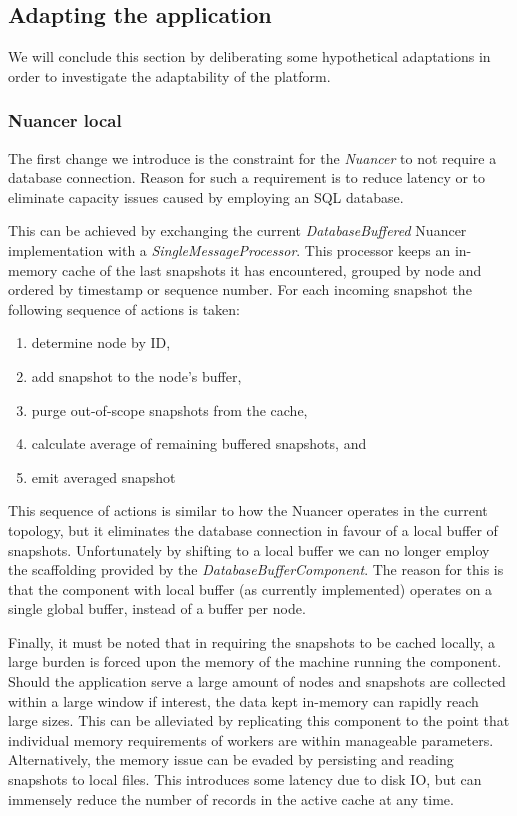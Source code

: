 \subsection{Adapting the application}
We will conclude this section by deliberating some hypothetical adaptations in order to investigate the adaptability of the platform.

\subsubsection{Nuancer local}
The first change we introduce is the constraint for the \emph{Nuancer} to not require a database connection. Reason for such a requirement is to reduce latency or to eliminate capacity issues caused by employing an SQL database. 

This can be achieved by exchanging the current \emph{DatabaseBuffered} Nuancer implementation with a \emph{SingleMessageProcessor}. This processor keeps an in-memory cache of the last snapshots it has encountered, grouped by node and ordered by timestamp or sequence number. For each incoming snapshot the following sequence of actions is taken:
\begin{enumerate}
\nospace
\item determine node by ID,
\item add snapshot to the node's buffer,
\item purge out-of-scope snapshots from the cache,
\item calculate average of remaining buffered snapshots, and
\item emit averaged snapshot
\end{enumerate}
This sequence of actions is similar to how the Nuancer operates in the current topology, but it eliminates the database connection in favour of a local buffer of snapshots. Unfortunately by shifting to a local buffer we can no longer employ the scaffolding provided by the \emph{DatabaseBufferComponent}. The reason for this is that the component with local buffer (as currently implemented) operates on a single global buffer, instead of a buffer per node.

Finally, it must be noted that in requiring the snapshots to be cached locally, a large burden is forced upon the memory of the machine running the component. Should the application serve a large amount of nodes and snapshots are collected within a large window if interest, the data kept in-memory can rapidly reach large sizes. This can be alleviated by replicating this component to the point that individual memory requirements of workers are within manageable parameters. Alternatively, the memory issue can be evaded by persisting and reading snapshots to local files. This introduces some latency due to disk IO, but can immensely reduce the number of records in the active cache at any time.

